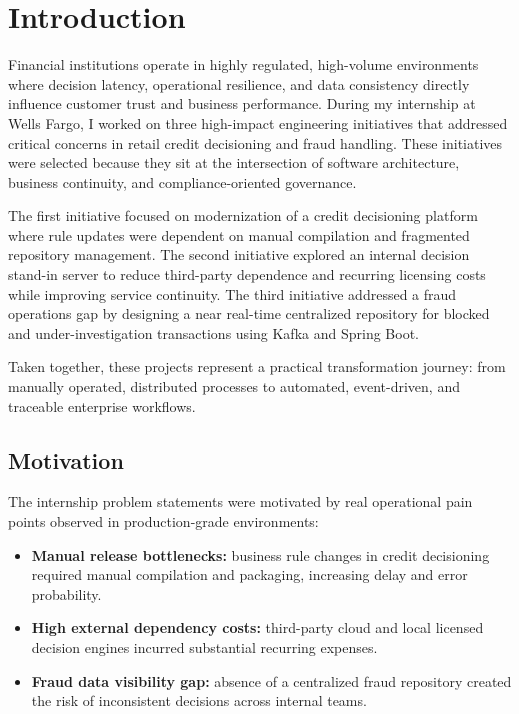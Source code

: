 \chapter{Introduction}

Financial institutions operate in highly regulated, high-volume environments where decision latency, operational resilience, and data consistency directly influence customer trust and business performance. During my internship at Wells Fargo, I worked on three high-impact engineering initiatives that addressed critical concerns in retail credit decisioning and fraud handling. These initiatives were selected because they sit at the intersection of software architecture, business continuity, and compliance-oriented governance.

The first initiative focused on modernization of a credit decisioning platform where rule updates were dependent on manual compilation and fragmented repository management. The second initiative explored an internal decision stand-in server to reduce third-party dependence and recurring licensing costs while improving service continuity. The third initiative addressed a fraud operations gap by designing a near real-time centralized repository for blocked and under-investigation transactions using Kafka and Spring Boot.

Taken together, these projects represent a practical transformation journey: from manually operated, distributed processes to automated, event-driven, and traceable enterprise workflows.

\section{Motivation}

The internship problem statements were motivated by real operational pain points observed in production-grade environments:

\begin{itemize}
	\item \textbf{Manual release bottlenecks:} business rule changes in credit decisioning required manual compilation and packaging, increasing delay and error probability.
	\item \textbf{High external dependency costs:} third-party cloud and local licensed decision engines incurred substantial recurring expenses.
	\item \textbf{Fraud data visibility gap:} absence of a centralized fraud repository created the risk of inconsistent decisions across internal teams.
\end{itemize}

